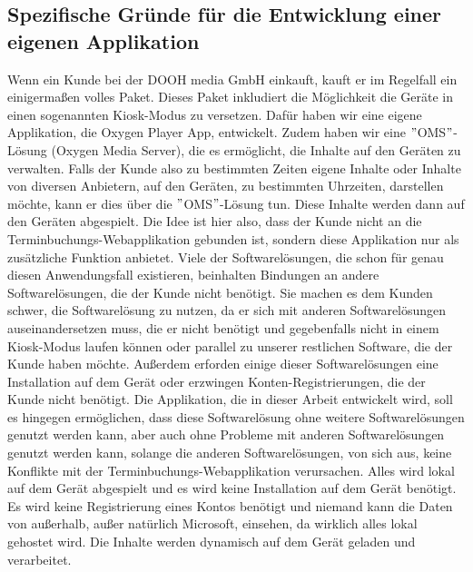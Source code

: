 \subsection{Spezifische Gründe für die Entwicklung einer eigenen Applikation}\label{subsec:spezifische-grunde-fur-die-entwicklung-einer-eigenen-applikation}
Wenn ein Kunde bei der DOOH media GmbH einkauft, kauft er im Regelfall ein einigermaßen volles Paket.
Dieses Paket inkludiert die Möglichkeit die Geräte in einen sogenannten Kiosk-Modus zu versetzen.
Dafür haben wir eine eigene Applikation, die Oxygen Player App, entwickelt.
Zudem haben wir eine \("\)OMS\("\)-Lösung (Oxygen Media Server), die es ermöglicht, die Inhalte auf den Geräten zu verwalten.
Falls der Kunde also zu bestimmten Zeiten eigene Inhalte oder Inhalte von diversen Anbietern, auf den Geräten, zu bestimmten Uhrzeiten, darstellen möchte, kann er dies über die \("\)OMS\("\)-Lösung tun.
Diese Inhalte werden dann auf den Geräten abgespielt.
\newline
Die Idee ist hier also, dass der Kunde nicht an die Terminbuchungs-Webapplikation gebunden ist, sondern diese Applikation nur als zusätzliche Funktion anbietet.
Viele der Softwarelösungen, die schon für genau diesen Anwendungsfall existieren, beinhalten Bindungen an andere Softwarelösungen, die der Kunde nicht benötigt.
Sie machen es dem Kunden schwer, die Softwarelösung zu nutzen, da er sich mit anderen Softwarelösungen auseinandersetzen muss, die er nicht benötigt und gegebenfalls nicht in einem Kiosk-Modus laufen können oder parallel zu unserer restlichen Software, die der Kunde haben möchte.
Außerdem erforden einige dieser Softwarelösungen eine Installation auf dem Gerät oder erzwingen Konten-Registrierungen, die der Kunde nicht benötigt.
\newline
Die Applikation, die in dieser Arbeit entwickelt wird, soll es hingegen ermöglichen, dass diese Softwarelösung ohne weitere Softwarelösungen genutzt werden kann, aber auch ohne Probleme mit anderen Softwarelösungen genutzt werden kann, solange die anderen Softwarelösungen, von sich aus, keine Konflikte mit der Terminbuchungs-Webapplikation verursachen.
Alles wird lokal auf dem Gerät abgespielt und es wird keine Installation auf dem Gerät benötigt.
Es wird keine Registrierung eines Kontos benötigt und niemand kann die Daten von außerhalb, außer natürlich Microsoft, einsehen, da wirklich alles lokal gehostet wird.
Die Inhalte werden dynamisch auf dem Gerät geladen und verarbeitet.
